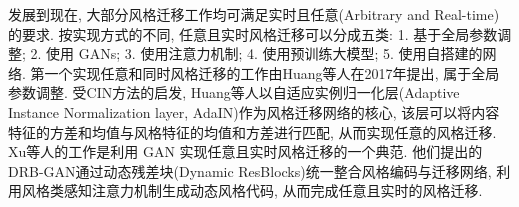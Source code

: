 发展到现在, 大部分风格迁移工作均可满足实时且任意(Arbitrary and Real-time)的要求. 按实现方式的不同, 任意且实时风格迁移可以分成五类: 1. 基于全局参数调整; 2. 使用 GANs; 3. 使用注意力机制; 4. 使用预训练大模型; 5. 使用自搭建的网络. 第一个实现任意和同时风格迁移的工作由Huang等人在2017年提出\cite{huang2017arbitrary}, 属于全局参数调整. 受CIN方法\cite{dumoulin2016learned}的启发, Huang等人以自适应实例归一化层(Adaptive Instance Normalization layer, AdaIN)作为风格迁移网络的核心, 该层可以将内容特征的方差和均值与风格特征的均值和方差进行匹配, 从而实现任意的风格迁移. 
Xu等人的工作\cite{xu2021drb}是利用 GAN 实现任意且实时风格迁移的一个典范. 他们提出的DRB-GAN通过动态残差块(Dynamic ResBlocks)统一整合风格编码与迁移网络, 利用风格类感知注意力机制生成动态风格代码, 从而完成任意且实时的风格迁移.